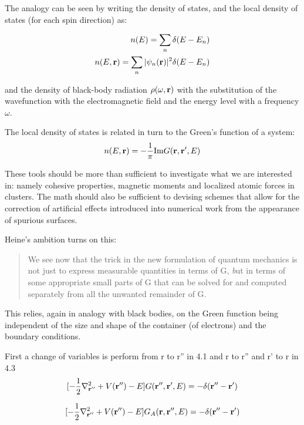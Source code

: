 \documentclass{article}
\def\r{{\bf r}}
\begin{document}
The analogy can be seen by writing the density of states,
and the local density of states (for each spin direction) as:

\begin{eqnarray}
n(E) = \sum_{n}\delta(E-E_{n}) \\
n(E,\r) = \sum_{n} |\psi_{n}(\r)|^{2}\delta(E-E_{n})
\end{eqnarray}

and the density of black-body radiation $\rho(\omega,\r)$
with the substitution of the wavefunction with the electromagnetic
field and the energy level with a frequency $\omega$.

The local density of states is related in turn to the 
Green's function of a system:
\begin{equation}
n(E,\r) = -\frac{1}{\pi}{\rm Im} G(\r,\r',E)
\end{equation}

These tools should be more than sufficient to investigate what
we are interested in: namely cohesive properties, magnetic moments
and localized atomic forces in clusters. The math
should also be sufficient to devising schemes that allow for the correction
of artificial effects introduced into numerical work from the appearance
of spurious surfaces.

Heine's ambition turns on this:
\begin{quote}
We see now that the trick in the new formulation of quantum 
mechanics is not just to express measurable quantities in terms of 
G, {\emph but in terms of some appropriate small parts of G that can be solved 
for and computed separately from all the unwanted remainder of G.}
\end{quote}

This relies, again in analogy with black bodies, on the Green
function being independent of the size and shape
of the container (of electrons) and the boundary conditions.


First a change of variables is perform from r to r'' in 4.1 and r to r'' and r'
to r in 4.3
\begin{equation}
\label{eq:greentot}
[-\frac{1}{2}\nabla^{2}_{\r''} + V(\r'') - E]G(\r'',\r',E)= -\delta(\r''-\r')
\end{equation}

\begin{equation}
\label{eq:greenA}
[-\frac{1}{2}\nabla^{2}_{\r''} + V(\r'') - E]G_{A}(\r,\r'',E)= -\delta(\r''-\r')
\end{equation}
\end{document}

